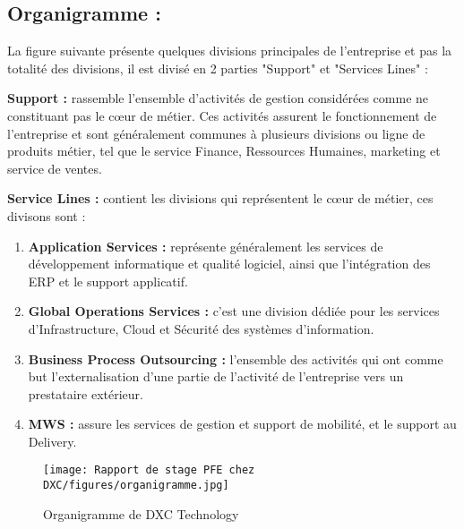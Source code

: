 \subsection{Organigramme :}
La figure suivante présente quelques divisions principales de l’entreprise et pas la totalité
des divisions, il est divisé en 2 parties "Support" et "Services Lines" :

\begin{description}
  \item \textbf{Support :} rassemble l’ensemble d'activités de gestion considérées comme ne constituant pas le cœur de métier. Ces activités assurent le fonctionnement de l'entreprise et sont généralement communes à plusieurs divisions ou ligne de produits métier, tel que le service Finance, Ressources Humaines, marketing et service de ventes.
  \item \textbf{Service Lines :} contient les divisions qui représentent le cœur de métier, ces divisons
 sont :
 \begin{enumerate}
   \item \textbf{Application Services :} représente généralement les services de développement informatique et qualité logiciel, ainsi que l’intégration des ERP et le support applicatif.
   \item \textbf{Global Operations Services :} c’est une division dédiée pour les services d’Infrastructure, Cloud et Sécurité des systèmes d’information.
   \item \textbf{Business Process Outsourcing : } l’ensemble des activités qui ont comme but l'externalisation d'une partie de l'activité de l'entreprise vers un prestataire extérieur.
    \item \textbf{MWS  : } assure les services de gestion et support de mobilité, et le support au Delivery.
 \end{enumerate}
  
  \begin{figure}[!h]
    \centering
    \texttt{[image: Rapport de stage PFE chez DXC/figures/organigramme.jpg]}
    \caption{Organigramme de DXC Technology}
\end{figure}
  
\end{description}


